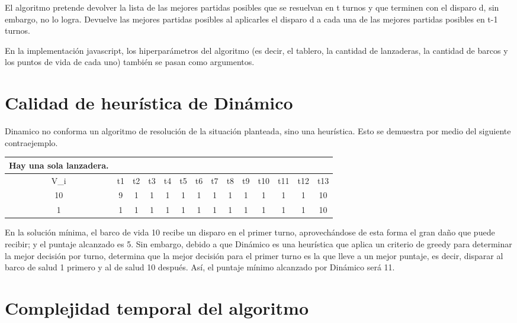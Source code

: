 \documentclass{article}
\begin{document}
El algoritmo pretende devolver la lista de las mejores partidas posibles que se resuelvan en t turnos y que terminen con el disparo d, sin embargo, no lo logra. Devuelve las mejores partidas posibles al aplicarles el disparo d a cada una de las mejores partidas posibles en t-1 turnos.

En la implementación javascript, los hiperparámetros del algoritmo (es decir, el tablero, la cantidad de lanzaderas, la cantidad de barcos y los puntos de vida de cada uno) también se pasan como argumentos.

\section{Calidad de heurística de Dinámico}

Dinamico no conforma un algoritmo de resolución de la situación planteada, sino una heurística. Esto se demuestra por medio del siguiente contraejemplo.

\begin{center}
\begin{tabular}{ c | c c c c c c c c c c c c c}
Hay una sola lanzadera. \\
\hline
V_i & t1 & t2 & t3 & t4 & t5 & t6 & t7 & t8 & t9 & t10 & t11 & t12 & t13 \\
\hline
10    &  9 &  1 &  1 &  1 &  1 &  1 & 1 &  1 &  1 &  1 &  1 & 1  & 10 \\
1     &  1 &  1 &  1 &  1 &  1 &  1 & 1 &  1 &  1 &  1 &  1 & 1  & 10
\end{tabular}
\end{center}

En la solución mínima, el barco de vida 10 recibe un disparo en el primer turno, aprovechándose de esta forma el gran daño que puede recibir; y el puntaje alcanzado es 5. Sin embargo, debido a que Dinámico es una heurística que aplica un criterio de greedy para determinar la mejor decisión por turno, determina que la mejor decisión para el primer turno es la que lleve a un mejor puntaje, es decir, disparar al barco de salud 1 primero y al de salud 10 después. Así, el puntaje mínimo alcanzado por Dinámico será 11.

\section{Complejidad temporal del algoritmo}
\end{document}
